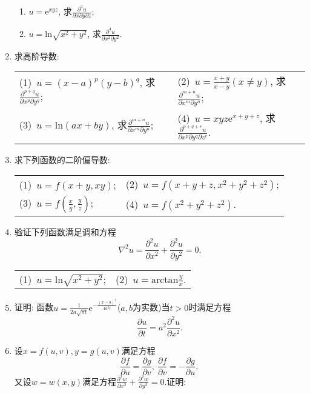 \begin{enumerate}
\begin{enumerate}
	\item $u=\mathrm{e}^{xyz}$, 求$\frac{\partial^3u}{\partial x \partial y \partial z}$;
	\item $u=\mathrm{ln}\sqrt{x^2+y^2}$, 求$\frac{\partial^4u}{\partial x^2\partial y^2}$.
\end{enumerate}
\item 求高阶导数:
\begin{table}[H]
	\begin{tabular}{ll}
		(1)\ $u=(x-a)^p(y-b)^q$, 求$\frac{\partial^{p+q}u}{\partial x^p\partial y^q}$;\qquad \qquad \qquad \qquad &(2)\ $u=\frac{x+y}{x-y}(x\ne y)$, 求$\frac{\partial^{m+n}u}{\partial x^m\partial y^n}$;\\
		(3)\ $u=\mathrm{ln}(ax+by)$, 求$\frac{\partial^{m+n}u}{\partial x^m\partial y^n}$;\qquad \qquad \qquad \qquad &(4)\ $u=xyz\mathrm{e}^{x+y+z}$, 求$\frac{\partial^{p+q+r}u}{\partial x^p\partial y^q\partial z^r}$.
	\end{tabular}
\end{table}
\item 求下列函数的二阶偏导数:
\begin{table}[H]
	\begin{tabular}{ll}
		(1)\ $u=f(x+y,xy)$;\qquad \qquad \qquad \qquad &(2)\ $u=f(x+y+z,x^2+y^2+z^2)$;\\
		(3)\ $u=f(\frac{x}{y}, \frac{y}{z})$;\qquad \qquad \qquad \qquad & (4)\ $u=f(x^2+y^2+z^2)$.
	\end{tabular}
\end{table}
\item 验证下列函数满足调和方程
$$\nabla^2u=\frac{\partial^2u}{\partial x^2}+\frac{\partial^2u}{\partial y^2}=0.$$
\begin{table}[H]
	\begin{tabular}{ll}
	\qquad \qquad (1)\ $u=\mathrm{ln}\sqrt{x^2+y^2}$;\qquad\qquad\qquad \qquad \qquad \qquad & (2)\ $u=\mathrm{arctan}\frac{y}{x}$.
	\end{tabular}
\end{table}
\item 证明: 函数$u=\frac{1}{2a\sqrt{\pi t}}\mathrm{e}^{-\frac{(x-b)^2}{4a^2t}}$($a,b$为实数)当$t>0$时满足方程
$$
\frac{\partial u}{\partial t}=a^2\frac{\partial^2 u}{\partial x^2}.$$
\item 设$x=f(u,v),y=g(u,v)$满足方程$$
\frac{\partial f}{\partial u} = \frac{\partial g}{\partial v},\ \frac{\partial f}{\partial v}=-\frac{\partial g}{\partial u},$$
又设$w=w(x,y)$满足方程$\frac{\partial^2 w}{\partial x^2}+\frac{\partial^2 w}{\partial y^2}=0$.证明:
\begin{enumerate}

\end{enumerate}
\end{enumerate}
